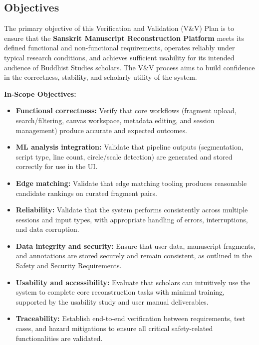 \documentclass[12pt, titlepage]{article}
\begin{document}
\subsection{Objectives}

The primary objective of this Verification and Validation (V\&V) Plan is to ensure that the \textbf{Sanskrit Manuscript Reconstruction Platform} meets its defined functional and non-functional requirements, operates reliably under typical research conditions, and achieves sufficient usability for its intended audience of Buddhist Studies scholars. The V\&V process aims to build confidence in the correctness, stability, and scholarly utility of the system.

\textbf{In-Scope Objectives:}
\begin{itemize}
    \item \textbf{Functional correctness:} Verify that core workflows (fragment upload, search/filtering, canvas workspace, metadata editing, and session management) produce accurate and expected outcomes.
    \item \textbf{ML analysis integration:} Validate that pipeline outputs (segmentation, script type, line count, circle/scale detection) are generated and stored correctly for use in the UI.
    \item \textbf{Edge matching:} Validate that edge matching tooling produces reasonable candidate rankings on curated fragment pairs.
    \item \textbf{Reliability:} Validate that the system performs consistently across multiple sessions and input types, with appropriate handling of errors, interruptions, and data corruption.
    \item \textbf{Data integrity and security:} Ensure that user data, manuscript fragments, and annotations are stored securely and remain consistent, as outlined in the Safety and Security Requirements.
    \item \textbf{Usability and accessibility:} Evaluate that scholars can intuitively use the system to complete core reconstruction tasks with minimal training, supported by the usability study and user manual deliverables.
    \item \textbf{Traceability:} Establish end-to-end verification between requirements, test cases, and hazard mitigations to ensure all critical safety-related functionalities are validated.
\end{itemize}
\end{document}
